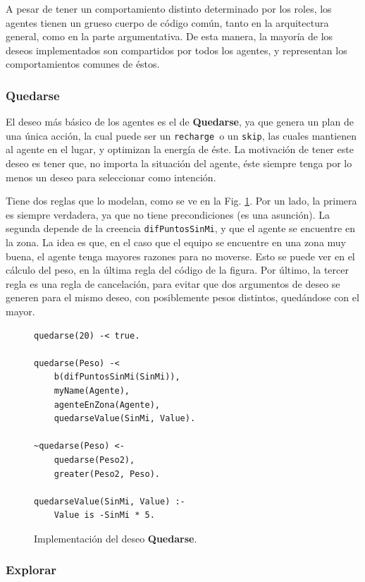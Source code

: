 \documentclass[oneside]{book}
\theoremstyle{definition}
\theoremstyle{example}
\begin{document}
A pesar de tener un comportamiento distinto determinado por los roles, los agentes
tienen un grueso cuerpo de código común, tanto en la arquitectura general, como 
en la parte argumentativa. De esta manera, la mayoría de los deseos implementados son
compartidos por todos los agentes, y representan los comportamientos comunes de éstos.

\subsubsection{Quedarse}

El deseo más básico de los agentes es el de \textbf{Quedarse}, ya que genera un plan de 
una única acción, la cual puede ser un \texttt{recharge}\ o un \texttt{skip}, las cuales
mantienen al agente en el lugar, y optimizan la energía de éste. La 
motivación de tener este deseo es tener que, no importa la situación del agente, éste
siempre tenga por lo menos un deseo para seleccionar como intención.

Tiene dos reglas que lo modelan, como se ve en la Fig. \ref{fig:deseoQuedarse}. Por un
lado, la primera es siempre verdadera, ya que no tiene precondiciones (es una asunción).
La segunda depende de la creencia \texttt{difPuntosSinMi}, y que el agente se encuentre
en la zona. La idea es que, en el caso que el equipo se encuentre en una zona muy buena,
el agente tenga mayores razones para no moverse. Esto se puede ver en el cálculo del 
peso, en la última regla del código de la figura. Por último, la tercer regla es una
regla de cancelación, para evitar que dos argumentos de deseo se generen para el mismo
deseo, con posiblemente pesos distintos, quedándose con el mayor.

\begin{figure}
\begin{verbatim}
quedarse(20) -< true.

quedarse(Peso) -< 
    b(difPuntosSinMi(SinMi)),
    myName(Agente),
    agenteEnZona(Agente),
    quedarseValue(SinMi, Value).

~quedarse(Peso) <-
    quedarse(Peso2),
    greater(Peso2, Peso).

quedarseValue(SinMi, Value) :-   
    Value is -SinMi * 5.
\end{verbatim}
\caption{Implementación del deseo \textbf{Quedarse}.}
\label{fig:deseoQuedarse}
\end{figure}


\subsubsection{Explorar}
\end{document}
